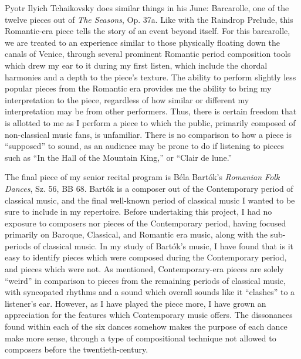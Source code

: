 Pyotr Ilyich Tchaikovsky does similar things in his June: Barcarolle, one of the twelve pieces out of \textit{The Seasons}, Op. 37a. Like with the Raindrop Prelude, this Romantic-era piece tells the story of an event beyond itself. For this barcarolle, we are treated to an experience similar to those physically floating down the canals of Venice, through several prominent Romantic period composition tools which drew my ear to it during my first listen, which include the chordal harmonies and a depth to the piece's texture. The ability to perform slightly less popular pieces from the Romantic era provides me the ability to bring my interpretation to the piece, regardless of how similar or different my interpretation may be from other performers. Thus, there is certain freedom that is allotted to me as I perform a piece to which the public, primarily composed of non-classical music fans, is unfamiliar. There is no comparison to how a piece is ``supposed'' to sound, as an audience may be prone to do if listening to pieces such as ``In the Hall of the Mountain King,'' or ``Clair de lune.''

The final piece of my senior recital program is Béla Bartók's \textit{Romanian Folk Dances}, Sz. 56, BB 68. Bartók is a composer out of the Contemporary period of classical music, and the final well-known period of classical music I wanted to be sure to include in my repertoire. Before undertaking this project, I had no exposure to composers nor pieces of the Contemporary period, having focused primarily on Baroque, Classical, and Romantic era music, along with the sub-periods of classical music. In my study of Bartók's music, I have found that is it easy to identify pieces which were composed during the Contemporary period, and pieces which were not. As mentioned, Contemporary-era pieces are solely ``weird'' in comparison to pieces from the remaining periods of classical music, with syncopated rhythms and a sound which overall sounds like it ``clashes'' to a listener's ear. However, as I have played the piece more, I have grown an appreciation for the features which Contemporary music offers. The dissonances found within each of the six dances somehow makes the purpose of each dance make more sense, through a type of compositional technique not allowed to composers before the twentieth-century. 